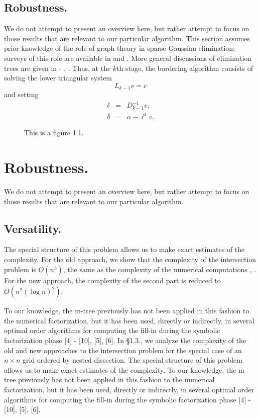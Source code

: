 \documentclass[twoside,leqno,twocolumn]{article}
\begin{document}
\subsection{Robustness.}We do not
attempt to present an overview
here, but rather attempt to focus on those results that
are relevant to our particular algorithm.
This section assumes prior knowledge of the role of graph theory
in sparse Gaussian elimination; surveys of this role are
available in \cite{ROSE72} and \cite{GEORGELIU}. More general
discussions of elimination trees are given in
\cite{LAW} - \cite{LIU2}, \cite{SCHREIBER}.
Thus, at the $k$th stage, the bordering algorithm consists of
solving the lower triangular system
\begin{equation} \label{1.2}
 L_{k-1}v = c
\end{equation}
and setting
\begin{eqnarray}
\ell &=& D^{-1}_{k-1}v , \\
\delta &=& \alpha - \ell^{t} v .
\end{eqnarray}

\begin{figure}
\vspace{14pc}
\caption{This is a figure 1.1.}
\end{figure}

\section{Robustness.} We do not
attempt to present an overview
here, but rather attempt to focus on those results that
are relevant to our particular algorithm.

\subsection{Versatility.}The special
structure of this problem allows us to make exact estimates of
the complexity.  For the old approach, we show that the
complexity of the intersection problem is $O(n^{3})$, the same
as the complexity of the numerical computations
\cite{GEORGELIU}, \cite{ROSEWHITTEN}.  For the
new approach, the complexity of the second part is reduced to
$O(n^{2} (\log n)^{2})$.

To our knowledge, the m-tree previously has not been applied in this
fashion to the numerical factorization, but it has been used,
directly or indirectly, in several optimal order algorithms for
computing the fill-in during the symbolic factorization phase
[4] - [10], [5], [6]. In \S 1.3., we analyze the complexity of the old and new
approaches to the intersection problem for the special case of
an $n \times n$ grid ordered by nested dissection. The special
structure of this problem allows us to make exact estimates of
the complexity. To our knowledge, the m-tree previously has not been applied in this
fashion to the numerical factorization, but it has been used,
directly or indirectly, in several optimal order algorithms for
computing the fill-in during the symbolic factorization phase
[4] - [10], [5], [6].
\end{document}
